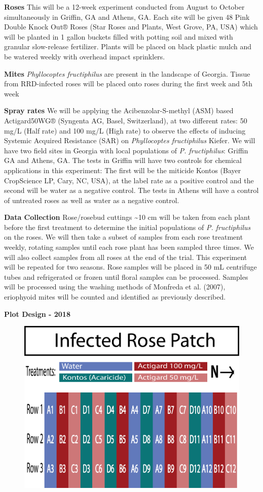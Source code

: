 \documentclass[12pt,final,CPage]{ufthesis}
\begin{document}
{  \textbf{Roses}
  This will be a 12-week experiment conducted from August to October simultaneously in Griffin, GA and Athens, GA.
  Each site will be given 48 Pink Double Knock Out® Roses (Star Roses and Plants, West Grove, PA, USA) which will be planted in 1 gallon buckets filled with potting soil and mixed with granular slow-release fertilizer. Plants will be placed on black plastic mulch and be watered weekly with overhead impact sprinklers.

  \textbf{Mites}
  \emph{Phyllocoptes fructiphilus} are present in the landscape of Georgia. Tissue from RRD-infected roses will be placed onto roses during the first week and 5th week

  \textbf{Spray rates}
  We will be applying the Acibenzolar-S-methyl (ASM) based Actigard50WG® (Syngenta AG, Basel, Switzerland), at two different rates: 50 mg/L (Half rate) and 100 mg/L (High rate) to observe the effects of inducing Systemic Acquired Resistance (SAR) on \emph{Phyllocoptes fructiphilus} Kiefer. We will have two field sites in Georgia with local populations of \emph{P. fructiphilus}: Griffin GA and Athens, GA. The tests in Griffin will have two controls for chemical applications in this experiment: The first will be the miticide Kontos (Bayer CropScience LP, Cary, NC, USA), at the label rate as a positive control and the second will be water as a negative control. The tests in Athens will have a control of untreated roses as well as water as a negative control.

  \textbf{Data Collection}
  Rose/rosebud cuttings \textasciitilde10 cm will be taken from each plant before the first treatment to determine the initial populations of \emph{P. fructiphilus} on the roses. We will then take a subset of samples from each rose treatment weekly, rotating samples until each rose plant has been sampled three times. We will also collect samples from all roses at the end of the trial. This experiment will be repeated for two seasons. Rose samples will be placed in 50 mL centrifuge tubes and refrigerated or frozen until floral samples can be processed. Samples will be processed using the washing methods of Monfreda et al. (2007), eriophyoid mites will be counted and identified as previously described.

  \textbf{Plot Design - 2018}
  \begin{figure}

  {\centering \includegraphics[width=0.8\linewidth]{figure/rrv_asm_plot_2018_griffin} 

}
\end{figure}}
\end{document}
